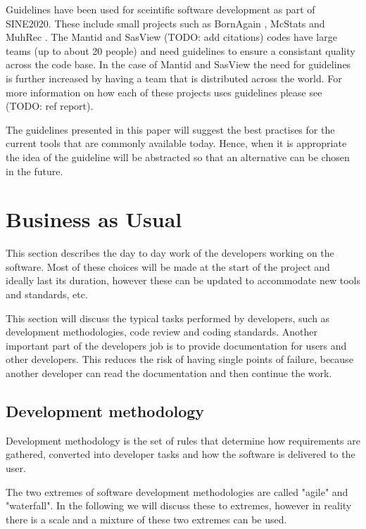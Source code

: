 \documentclass[jnr]{iosart2x}
\begin{document}
Guidelines have been used for sceintific software development as part of SINE2020. 
These include small projects such as BornAgain \cite{}, McStats \cite{} and MuhRec \cite{}. 
The Mantid \cite{} and SasView \cite{} (TODO: add citations) codes have large teams (up to about 20 people) and need guidelines to ensure a consistant quality across the code base. 
In the case of Mantid and SasView the need for guidelines is further increased by having a team that is distributed across the world. 
For more information on how each of these projects uses guidelines please see \cite{} (TODO: ref report).   

The guidelines presented in this paper will suggest the best practises for the current tools that are commonly available today.
Hence, when it is appropriate the idea of the guideline will be abstracted so that an alternative can be chosen in the future.


\section{Business as Usual}
\label{Business as Usual}

This section describes the day to day work of the developers working on the software.
Most of these choices will be made at the start of the project and ideally last its duration, however these can be updated to accommodate new tools and standards, etc.

This section will discuss the typical tasks performed by developers, such as development methodologies, code review and coding standards.
Another important part of the developers job is to provide documentation for users and other developers.
This reduces the risk of having single points of failure, because another developer can read the documentation and then continue the work.

\subsection{Development methodology}
\label{Development methodology}

Development methodology is the set of rules that determine how requirements are gathered, converted into developer tasks and how the software is delivered to the user.

The two extremes of software development methodologies are called "agile" and "waterfall".
In the following we will discuss these to extremes, however in reality there is a scale and a mixture of these two extremes can be used.
\end{document}
